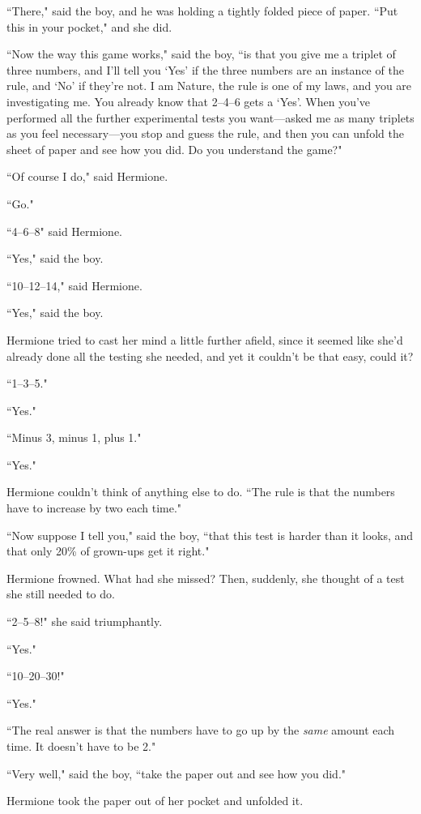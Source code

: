 ``There," said the boy, and he was holding a tightly folded piece of paper. ``Put this in your pocket," and she did.

``Now the way this game works," said the boy, ``is that you give me a triplet of three numbers, and I'll tell you `Yes' if the three numbers are an instance of the rule, and `No' if they're not. I am Nature, the rule is one of my laws, and you are investigating me. You already know that 2--4--6 gets a `Yes'. When you've performed all the further experimental tests you want—asked me as many triplets as you feel necessary—you stop and guess the rule, and then you can unfold the sheet of paper and see how you did. Do you understand the game?"

``Of course I do," said Hermione.

``Go."

``4--6--8" said Hermione.

``Yes," said the boy.

``10--12--14," said Hermione.

``Yes," said the boy.

Hermione tried to cast her mind a little further afield, since it seemed like she'd already done all the testing she needed, and yet it couldn't be that easy, could it?

``1--3--5."

``Yes."

``Minus 3, minus 1, plus 1."

``Yes."

Hermione couldn't think of anything else to do. ``The rule is that the numbers have to increase by two each time."

``Now suppose I tell you," said the boy, ``that this test is harder than it looks, and that only 20\% of grown-ups get it right."

Hermione frowned. What had she missed? Then, suddenly, she thought of a test she still needed to do.

``2--5--8!" she said triumphantly.

``Yes."

``10--20--30!"

``Yes."

``The real answer is that the numbers have to go up by the \emph{same} amount each time. It doesn't have to be 2."

``Very well," said the boy, ``take the paper out and see how you did."

Hermione took the paper out of her pocket and unfolded it.

